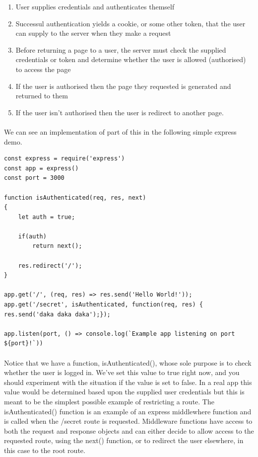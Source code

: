 \documentclass[10pt, a4paper, twosize]{article}
\begin{document}
\begin{enumerate}
\item User supplies credentials and authenticates themself
\item Successul authentication yields a cookie, or some other token, that the user can supply to the server when they make a request
\item Before returning a page to a user, the server must check the supplied credentials or token and determine whether the user is allowed (authorised) to access the page
\item If the user is authorised then the page they requested is generated and returned to them
\item If the user isn't authorised then the user is redirect to another page.
\end{enumerate}

\paragraph{} We can see an implementation of part of this in the following simple express demo.
\begin{lstlisting}
const express = require('express')
const app = express()
const port = 3000

function isAuthenticated(req, res, next)
{
    let auth = true;

    if(auth)
        return next();

    res.redirect('/');
}

app.get('/', (req, res) => res.send('Hello World!'));
app.get('/secret', isAuthenticated, function(req, res) { res.send('daka daka daka');});

app.listen(port, () => console.log(`Example app listening on port ${port}!`))
\end{lstlisting}
\paragraph{} Notice that we have a function, isAuthenticated(), whose sole purpose is to check whether the user is logged in. We've set this value to true right now, and you should experiment with the situation if the value is set to false. In a real app this value would be determined based upon the supplied user credentials but this is meant to be the simplest possible example of restricting a route. The isAuthenticated() function is an example of an express middlewhere function and is called when the /secret route is requested. Middleware functions have access to both the request and response objects and can either decide to allow access to the requested route, using the next() function, or to redirect the user elsewhere, in this case to the root route.
\end{document}
